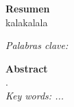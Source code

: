 \documentclass[12pt,letterpaper,oneside]{book}
\theoremstyle{plain}
\theoremstyle{definition}
\theoremstyle{remark}
\begin{document}
\newpage\null\thispagestyle{empty}\newpage

\newpage
\thispagestyle{empty}
\vspace*{3.5cm}

{\Large\textbf{Resumen}}\\

kalakalala

 
 

\textit{Palabras clave: }\\

\bigskip

{\Large\textbf{Abstract}}\\

.\\

\textit{Key words: ...}


\tableofcontents\thispagestyle{empty}
\pagestyle{plain}
\mainmatter
\pagestyle{fancy}
\fancyhf{}
\fancyhead[LO]{\leftmark}
\fancyhead[RO,LE]{\thepage}



\newpage

\newpage

\newpage

\newpage

\newpage

\newpage

\newpage

\newpage\null\thispagestyle{empty}\newpage
%
\newpage


%
%












\end{document}
